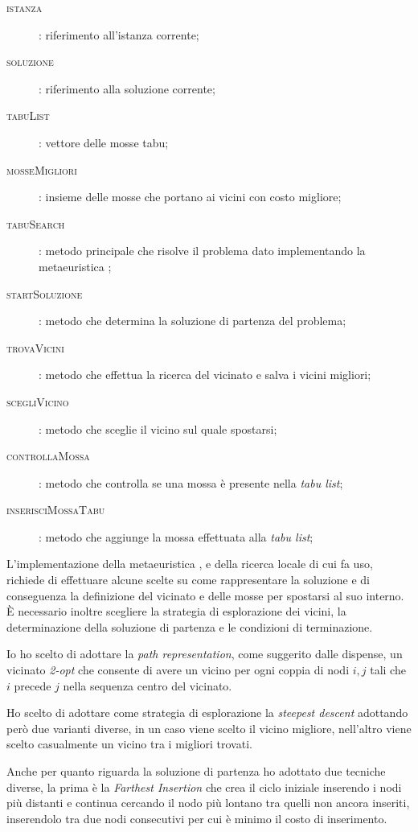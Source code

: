 \begin{description}
\begin{description}
		\item[\textsc{istanza}]: riferimento all'istanza corrente;
		\item[\textsc{soluzione}]: riferimento alla soluzione corrente;
		\item[\textsc{tabuList}]: vettore delle mosse tabu;
		\item[\textsc{mosseMigliori}]: insieme delle mosse che portano ai vicini con costo migliore;
		\item[\textsc{tabuSearch}]: metodo principale che risolve il problema dato implementando la metaeuristica \tabu;
		\item[\textsc{startSoluzione}]: metodo che determina la soluzione di partenza del problema;
		\item[\textsc{trovaVicini}]: metodo che effettua la ricerca del vicinato e salva i vicini migliori;
		\item[\textsc{scegliVicino}]: metodo che sceglie il vicino sul quale spostarsi;
		\item[\textsc{controllaMossa}]: metodo che controlla se una mossa è presente nella \emph{tabu list};
		\item[\textsc{inserisciMossaTabu}]: metodo che aggiunge la mossa effettuata alla \emph{tabu list};
	\end{description}
\end{description}

L'implementazione della metaeuristica \tabu, e della ricerca locale di cui fa uso, richiede di effettuare alcune scelte su come rappresentare la soluzione e di conseguenza la definizione del vicinato e delle mosse per spostarsi al suo interno. È necessario inoltre scegliere la strategia di esplorazione dei vicini, la determinazione della soluzione di partenza e le condizioni di terminazione.

Io ho scelto di adottare la \emph{path representation}, come suggerito dalle dispense, un vicinato \emph{2-opt} che consente di avere un vicino per ogni coppia di nodi $i, j$ tali che $i$ precede $j$ nella sequenza centro del vicinato.

Ho scelto di adottare come strategia di esplorazione la \emph{steepest descent} adottando però due varianti diverse, in un caso viene scelto il vicino migliore, nell'altro viene scelto casualmente un vicino tra i migliori trovati.

Anche per quanto riguarda la soluzione di partenza ho adottato due tecniche diverse, la prima è la \emph{Farthest Insertion} che crea il ciclo iniziale inserendo i nodi più distanti e continua cercando il nodo più lontano tra quelli non ancora inseriti, inserendolo tra due nodi consecutivi per cui è minimo il costo di inserimento.


